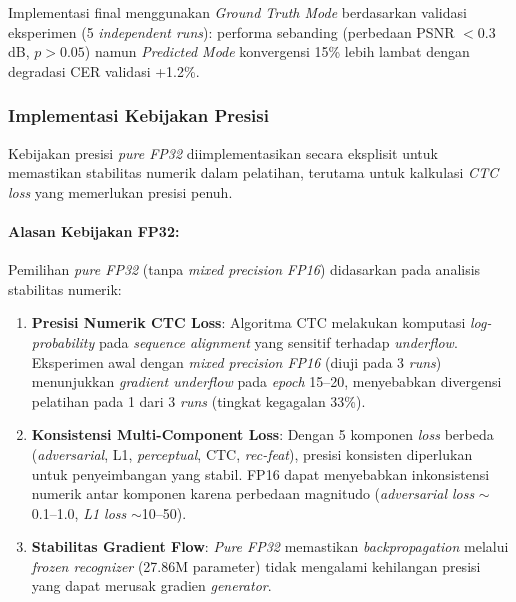 Implementasi final menggunakan \textit{Ground Truth Mode} berdasarkan validasi eksperimen (5 \textit{independent runs}): performa sebanding (perbedaan PSNR $<$0.3 dB, $p>0.05$) namun \textit{Predicted Mode} konvergensi 15\% lebih lambat dengan degradasi CER validasi +1.2\%.



\subsubsection{Implementasi Kebijakan Presisi}
\label{subsubsec:precision-policy-implementasi}

Kebijakan presisi \textit{pure FP32} diimplementasikan secara eksplisit untuk memastikan stabilitas numerik dalam pelatihan, terutama untuk kalkulasi \textit{CTC loss} yang memerlukan presisi penuh.

\paragraph{Alasan Kebijakan FP32:}

Pemilihan \textit{pure FP32} (tanpa \textit{mixed precision FP16}) didasarkan pada analisis stabilitas numerik:

\begin{enumerate}[nosep]
\item \textbf{Presisi Numerik CTC Loss}: Algoritma CTC melakukan komputasi \textit{log-probability} pada \textit{sequence alignment} yang sensitif terhadap \textit{underflow}. Eksperimen awal dengan \textit{mixed precision FP16} (diuji pada 3 \textit{runs}) menunjukkan \textit{gradient underflow} pada \textit{epoch} 15--20, menyebabkan divergensi pelatihan pada 1 dari 3 \textit{runs} (tingkat kegagalan 33\%).

\item \textbf{Konsistensi Multi-Component Loss}: Dengan 5 komponen \textit{loss} berbeda (\textit{adversarial}, L1, \textit{perceptual}, CTC, \textit{rec-feat}), presisi konsisten diperlukan untuk penyeimbangan yang stabil. FP16 dapat menyebabkan inkonsistensi numerik antar komponen karena perbedaan magnitudo (\textit{adversarial loss} $\sim$0.1--1.0, \textit{L1 loss} $\sim$10--50).

\item \textbf{Stabilitas Gradient Flow}: \textit{Pure FP32} memastikan \textit{backpropagation} melalui \textit{frozen recognizer} (27.86M parameter) tidak mengalami kehilangan presisi yang dapat merusak gradien \textit{generator}.
\end{enumerate}

